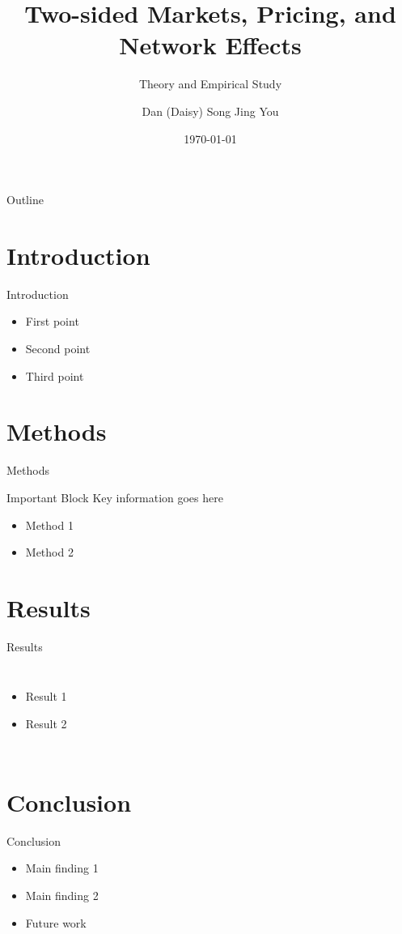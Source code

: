 \documentclass[aspectratio=169]{beamer}  %
\title{Two-sided Markets, Pricing, and Network Effects}
\subtitle{Theory and Empirical Study}
\author{Dan (Daisy) Song \quad Jing You}
\institute{Hong Kong University of Science and Technology}
\date{\today}
\begin{document}
\begin{frame}
    \titlepage
\end{frame}

\begin{frame}{Outline}
    \tableofcontents
\end{frame}

\section{Introduction}
\begin{frame}{Introduction}
    \begin{itemize}
        \item First point
        \item Second point
        \item Third point
    \end{itemize}
\end{frame}

\section{Methods}
\begin{frame}{Methods}
    \begin{block}{Important Block}
        Key information goes here
    \end{block}
    
    \begin{itemize}
        \item Method 1
        \item Method 2
    \end{itemize}
\end{frame}

\section{Results}
\begin{frame}{Results}
    \begin{columns}
        \begin{itemize}
            \item Result 1
            \item Result 2
        \end{itemize}
        
    \end{columns}
\end{frame}

\section{Conclusion}
\begin{frame}{Conclusion}
    \begin{itemize}
        \item Main finding 1
        \item Main finding 2
        \item Future work
    \end{itemize}
\end{frame}
\end{document}
